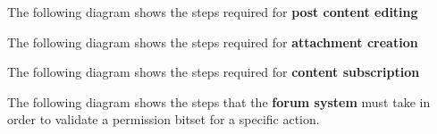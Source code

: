 \documentclass[12pt]{report}
\renewcommand\emph{\textbf}
\begin{document}


                \newpage

                The following diagram shows the steps required for \emph{post content editing}


                \newpage

                The following diagram shows the steps required for \emph{attachment creation}


                \newpage

                The following diagram shows the steps required for \emph{content subscription}


                \newpage

                The following diagram shows the steps that the \emph{forum system} must take in order to validate a permission bitset for a specific action.

\end{document}
